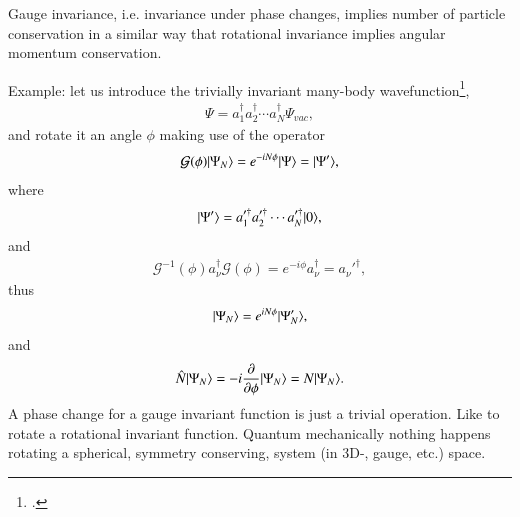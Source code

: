  Gauge invariance, i.e. invariance under phase changes, implies number of particle conservation in a similar way that rotational invariance implies angular momentum conservation.

Example: let us introduce the trivially invariant many-body wavefunction\footnote{\cite{Anderson:64b}.},
\begin{align}\label{eq3.7.12}
\Psi=a_1^\dagger a_2^\dagger\dotsb a_N^\dagger \Psi_{vac},
\end{align}
and rotate it an angle $\phi$ making use of the operator
\begin{align}\label{eq3.7.13}
\mathcal G(\phi)|{\Psi_N} \rangle=e^{-iN\phi}|{\Psi} \rangle=|{\Psi'} \rangle,
\end{align}
where
\begin{align}\label{eq3.7.14}
|{\Psi'} \rangle=a_1'^\dagger a_2'^\dagger\dotsb a_N'^\dagger|{0} \rangle,
\end{align}
and
\begin{align}\label{eq3.7.15}
\mathcal G^{-1}(\phi)a_\nu^\dagger \mathcal G(\phi)=e^{-i\phi}a_\nu^\dagger=a_\nu'^\dagger,
\end{align}
thus
\begin{align}\label{eq3.7.16}
|{\Psi_N} \rangle=e^{iN\phi}|{\Psi'_N} \rangle,
\end{align}
and
\begin{align}\label{eq3.7.17}
\hat N|{\Psi_N} \rangle=-i\frac{\partial}{\partial \phi}|{\Psi_N} \rangle=N|{\Psi_N} \rangle.
\end{align}
 A phase change for a gauge invariant function is just a trivial operation. Like to rotate a rotational invariant function. Quantum mechanically nothing happens rotating a spherical, symmetry conserving, system (in 3D-, gauge, etc.) space.



